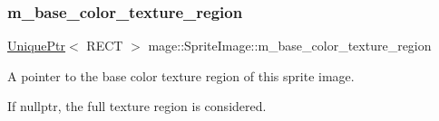 \subsubsection{\texorpdfstring{m\+\_\+base\+\_\+color\+\_\+texture\+\_\+region}{m\_base\_color\_texture\_region}}
{\footnotesize\ttfamily \hyperlink{namespacemage_a3316d7143a973e37adf1110f2e80ca31}{Unique\+Ptr}$<$ R\+E\+CT $>$ mage\+::\+Sprite\+Image\+::m\+\_\+base\+\_\+color\+\_\+texture\+\_\+region\hspace{0.3cm}{\ttfamily [private]}}

A pointer to the base color texture region of this sprite image.

If {\ttfamily nullptr}, the full texture region is considered. 